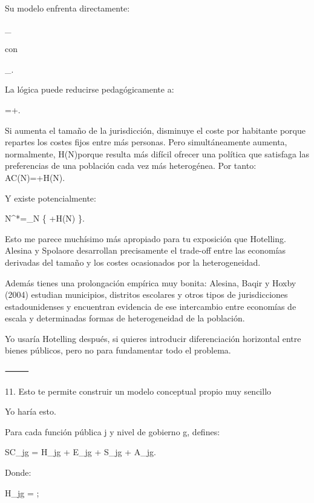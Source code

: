 \documentclass[10pt,a4paper]{article}
\begin{document}
Su modelo enfrenta directamente:

_{}

con

_{}.

La lógica puede reducirse pedagógicamente a:

=+.

Si aumenta el tamaño de la jurisdicción, disminuye el coste por habitante porque repartes los costes fijos entre más personas. Pero simultáneamente aumenta, normalmente, H(N)\uparrow porque resulta más difícil ofrecer una política que satisfaga las preferencias de una población cada vez más heterogénea. Por tanto: AC(N)=+H(N).

Y existe potencialmente:

N^*=\arg\min_N
\left\{
+H(N)
\right\}.

Esto me parece muchísimo más apropiado para tu exposición que Hotelling. Alesina y Spolaore desarrollan precisamente el trade-off entre las economías derivadas del tamaño y los costes ocasionados por la heterogeneidad.  

Además tienes una prolongación empírica muy bonita: Alesina, Baqir y Hoxby (2004) estudian municipios, distritos escolares y otros tipos de jurisdicciones estadounidenses y encuentran evidencia de ese intercambio entre economías de escala y determinadas formas de heterogeneidad de la población.  

Yo usaría Hotelling después, si quieres introducir diferenciación horizontal entre bienes públicos, pero no para fundamentar todo el problema.












⸻

11. Esto te permite construir un modelo conceptual propio muy sencillo

Yo haría esto.

Para cada función pública j y nivel de gobierno g, defines:

SC_{jg}
=
H_{jg}
+
E_{jg}
+
S_{jg}
+
A_{jg}.

Donde:

H_{jg}
=
;
\end{document}
